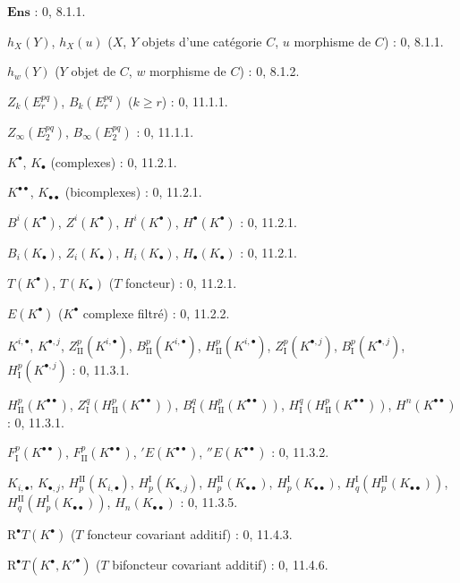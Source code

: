 \begin{flushleft}
$\mathbf{Ens}$ : 0, 8.1.1.

$h_X(Y)$, $h_X(u)$ ($X$, $Y$ objets d'une catégorie $C$, $u$ morphisme de
$C$) : 0, 8.1.1.

$h_w(Y)$ ($Y$ objet de $C$, $w$ morphisme de $C$) : 0, 8.1.2.

$Z_k(E_r^{pq})$, $B_k(E_r^{pq})$ ($k\geq r$) : 0, 11.1.1.

$Z_\infty(E_2^{pq})$, $B_\infty(E_2^{pq})$ : 0, 11.1.1.

$K^\bullet$, $K_\bullet$ (complexes) : 0, 11.2.1.

$K^{\bullet\bullet}$, $K_{\bullet\bullet}$ (bicomplexes) : 0, 11.2.1.

$B^i(K^\bullet)$, $Z^i(K^\bullet)$, $H^i(K^\bullet)$,
$H^\bullet(K^\bullet)$ : 0, 11.2.1.

$B_i(K_\bullet)$, $Z_i(K_\bullet)$, $H_i(K_\bullet)$,
$H_\bullet(K_\bullet)$ : 0, 11.2.1.

$T(K^\bullet)$, $T(K_\bullet)$ ($T$ foncteur) : 0, 11.2.1.

$E(K^\bullet)$ ($K^\bullet$ complexe filtré) : 0, 11.2.2.

$K^{i,\bullet}$, $K^{\bullet,j}$, $Z_{\mathrm{II}}^p(K^{i,\bullet})$,
$B_{\mathrm{II}}^p(K^{i,\bullet})$, $H_{\mathrm{II}}^p(K^{i,\bullet})$,
$Z_{\mathrm I}^p(K^{\bullet,j})$, $B_{\mathrm I}^p(K^{\bullet,j})$,
$H_{\mathrm I}^p(K^{\bullet,j})$ : 0, 11.3.1.

$H_{\mathrm{II}}^p(K^{\bullet\bullet})$,
$Z_{\mathrm I}^q(H_{\mathrm{II}}^p(K^{\bullet\bullet}))$,
$B_{\mathrm I}^q(H_{\mathrm{II}}^p(K^{\bullet\bullet}))$,
$H_{\mathrm I}^q(H_{\mathrm{II}}^p(K^{\bullet\bullet}))$,
$H^n(K^{\bullet\bullet})$ : 0, 11.3.1.

$F_{\mathrm I}^p(K^{\bullet\bullet})$,
$F_{\mathrm{II}}^p(K^{\bullet\bullet})$, ${}'E(K^{\bullet\bullet})$,
${}''E(K^{\bullet\bullet})$ : 0, 11.3.2.

$K_{i,\bullet}$, $K_{\bullet,j}$, $H_p^{\mathrm{II}}(K_{i,\bullet})$,
$H_p^{\mathrm I}(K_{\bullet,j})$, $H_p^{\mathrm{II}}(K_{\bullet\bullet})$,
$H_p^{\mathrm I}(K_{\bullet\bullet})$,
$H_q^{\mathrm I}(H_p^{\mathrm{II}}(K_{\bullet\bullet}))$,
$H_q^{\mathrm{II}}(H_p^{\mathrm I}(K_{\bullet\bullet}))$,
$H_n(K_{\bullet\bullet})$ : 0, 11.3.5.

$\mathrm R^\bullet T(K^\bullet)$ ($T$ foncteur covariant additif) : 0, 11.4.3.

$\mathrm R^\bullet T(K^\bullet,K'^{\bullet})$ ($T$ bifoncteur covariant
additif) : 0, 11.4.6.


\end{flushleft}
